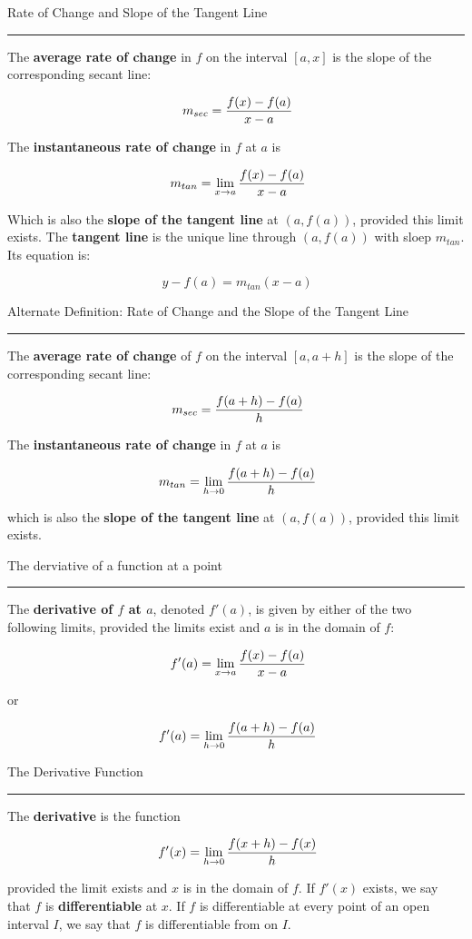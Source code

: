 
\def\begdef#1{
\vbox\bgroup
{\headerfont #1}\smallskip
\hrule\smallskip
}

\def\enddef{
\egroup
\bigskip\bigskip
}

\begdef{Rate of Change and Slope of the Tangent Line}
\enddef

The {\bf average rate of change} in $f$ on the interval
$[a, x]$ is the slope of the corresponding secant line:

$$\
m_{sec} = {f(x) - f(a) \over x - a}
$$

The {\bf instantaneous rate of change} in $f$ at $a$ is

$$\
m_{tan} = \lim_{x \to a} {
f(x) - f(a)
\over
x - a
}
$$

Which is also the {\bf slope of the tangent line} at $(a, f(a))$,
provided this limit exists. The {\bf tangent line} is the unique
line through $(a, f(a))$ with sloep $m_{tan}$. Its equation is:

$$\
y - f(a) = m_{tan}(x- a)
$$

\begdef {Alternate Definition: Rate of Change and the Slope of the Tangent Line}
The {\bf average rate of change} of $f$ on the interval $[a, a + h]$
is the slope of the corresponding secant line:

$$\
m_{sec} = {
f(a + h) - f(a)
\over
h
}
$$

The {\bf instantaneous rate of change} in $f$ at $a$ is

$$\
m_{tan} = \lim_{h \to 0}{
f(a + h) - f(a)
\over
h
}
$$

which is also the {\bf slope of the tangent line} at $(a, f(a))$,
provided this limit exists.

\enddef

\begdef{The derviative of a function at a point}
The {\bf derivative of $f$ at $a$}, denoted $f'(a)$, is given
by either of the two following limits, provided the limits exist and $a$ is in the
domain of $f$:

$$\
f'(a) = \lim_{x \to a}{
f(x) - f(a)
\over
x - a
}
$$

or

$$\
f'(a) = \lim_{h \to 0}{
f(a + h) - f(a)
\over
h
}
$$

\enddef

\begdef{The Derivative Function}
The {\bf derivative} is the function

$$\
f'(x) = \lim_{h \to 0}{
f(x + h) - f(x)
\over
h
}
$$

provided the limit exists and $x$ is in the domain of $f$.
If $f'(x)$ exists, we say that $f$ is {\bf differentiable}
at $x$. If $f$ is differentiable at every point of an open
interval $I$, we say that $f$ is differentiable from on $I$.

